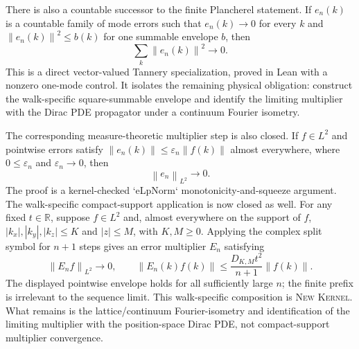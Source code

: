 \documentclass[11pt]{article}
\newcommand{\Kernel}{\textcolor{kernelcolor}{\textsc{Kernel}}}
\newcommand{\NewResult}{\textsc{New}}
\newcommand{\norm}[1]{\left\lVert #1\right\rVert}
\begin{document}
  There is also a countable successor to the finite Plancherel statement.  If
  $e_n(k)$ is a countable family of mode errors such that
  $e_n(k)\to0$ for every $k$ and
  $\norm{e_n(k)}^2\leq b(k)$ for one summable envelope $b$, then
  \begin{equation}\label{eq:countablel2}
    \sum_k \norm{e_n(k)}^2\longrightarrow0.
  \end{equation}
  This is a direct vector-valued Tannery specialization, proved in Lean with a
  nonzero one-mode control.  It isolates the remaining physical obligation:
  construct the walk-specific square-summable envelope and identify the
  limiting multiplier with the Dirac PDE propagator under a continuum Fourier
  isometry.

  The corresponding measure-theoretic multiplier step is also closed.  If
  $f\in L^2$ and pointwise errors satisfy
  $\norm{e_n(k)}\leq\varepsilon_n\norm{f(k)}$ almost everywhere, where
  $0\leq\varepsilon_n$ and $\varepsilon_n\to0$, then
  \begin{equation}\label{eq:continuousl2multiplier}
    \norm{e_n}_{L^2}\longrightarrow0.
  \end{equation}
  The proof is a kernel-checked `eLpNorm` monotonicity-and-squeeze argument.
  The walk-specific compact-support application is now closed as well.  For any
  fixed $t\in\mathbb R$, suppose $f\in L^2$ and, almost everywhere on the support of $f$,
  $|k_x|,|k_y|,|k_z|\leq K$ and $|z|\leq M$, with $K,M\geq0$.  Applying the
  complex split symbol for $n+1$ steps gives an error multiplier $E_n$ satisfying
  \begin{equation}\label{eq:walkcompactl2}
    \norm{E_nf}_{L^2}\longrightarrow0,
    \qquad
    \norm{E_n(k)f(k)}
      \leq\frac{D_{K,M}t^2}{n+1}\norm{f(k)}.
  \end{equation}
  The displayed pointwise envelope holds for all sufficiently large $n$; the
  finite prefix is irrelevant to the sequence limit.
  This walk-specific composition is \NewResult{} \Kernel{}.  What remains is
  the lattice/continuum Fourier-isometry and identification of the limiting
  multiplier with the position-space Dirac PDE, not compact-support multiplier
  convergence.
\end{document}
